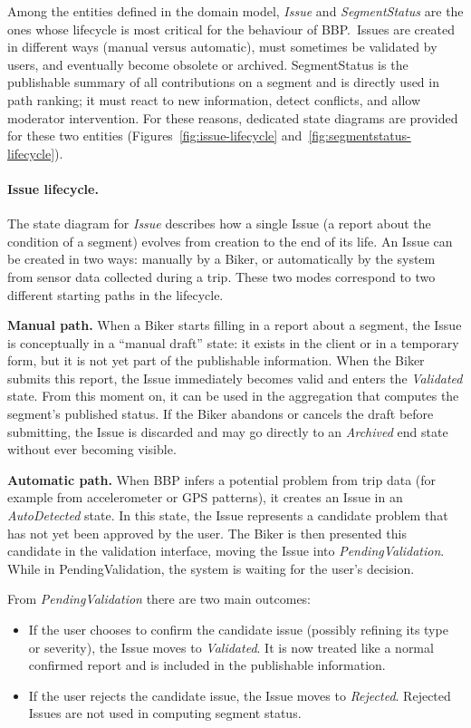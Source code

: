 Among the entities defined in the domain model, \textit{Issue} and \textit{SegmentStatus} are the ones whose lifecycle is most critical for the behaviour of BBP.\ Issues are created in different ways (manual versus automatic), must sometimes be validated by users, and eventually become obsolete or archived. SegmentStatus is the publishable summary of all contributions on a segment and is directly used in path ranking; it must react to new information, detect conflicts, and allow moderator intervention. For these reasons, dedicated state diagrams are provided for these two entities (Figures~\ref{fig:issue-lifecycle} and~\ref{fig:segmentstatus-lifecycle}).

\paragraph{Issue lifecycle.}
The state diagram for \textit{Issue} describes how a single Issue (a report about the condition of a segment) evolves from creation to the end of its life. An Issue can be created in two ways: manually by a Biker, or automatically by the system from sensor data collected during a trip. These two modes correspond to two different starting paths in the lifecycle.

\textbf{Manual path.}
When a Biker starts filling in a report about a segment, the Issue is conceptually in a ``manual draft'' state: it exists in the client or in a temporary form, but it is not yet part of the publishable information. When the Biker submits this report, the Issue immediately becomes valid and enters the \textit{Validated} state. From this moment on, it can be used in the aggregation that computes the segment's published status. If the Biker abandons or cancels the draft before submitting, the Issue is discarded and may go directly to an \textit{Archived} end state without ever becoming visible.

\textbf{Automatic path.}
When BBP infers a potential problem from trip data (for example from accelerometer or GPS patterns), it creates an Issue in an \textit{AutoDetected} state. In this state, the Issue represents a candidate problem that has not yet been approved by the user. The Biker is then presented this candidate in the validation interface, moving the Issue into \textit{PendingValidation}. While in PendingValidation, the system is waiting for the user's decision.

From \textit{PendingValidation} there are two main outcomes:
\begin{itemize}
    \item If the user chooses to confirm the candidate issue (possibly refining its type or severity), the Issue moves to \textit{Validated}. It is now treated like a normal confirmed report and is included in the publishable information.
    \item If the user rejects the candidate issue, the Issue moves to \textit{Rejected}. Rejected Issues are not used in computing segment status.
\end{itemize}

